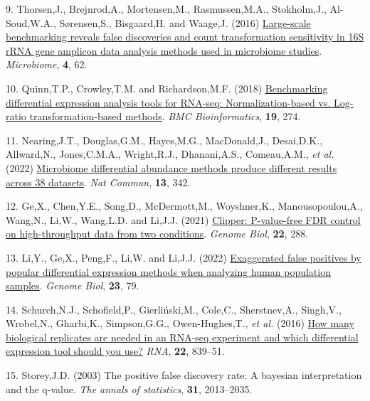 \documentclass[
]{article}
\newlength{\cslhangindent}
\newenvironment{CSLReferences}[2] %
 {\begin{list}{}{%
  \setlength{\itemindent}{0pt}
  \setlength{\leftmargin}{0pt}
  \setlength{\parsep}{0pt}
  \ifodd #1
   \setlength{\leftmargin}{\cslhangindent}
   \setlength{\itemindent}{-1\cslhangindent}
  \fi
  \setlength{\itemsep}{#2\baselineskip}}}
 {\end{list}}
\begin{document}
\begin{CSLReferences}{1}{1}
9. Thorsen,J., Brejnrod,A., Mortensen,M., Rasmussen,M.A., Stokholm,J.,
Al-Soud,W.A., Sørensen,S., Bisgaard,H. and Waage,J. (2016)
\href{https://doi.org/10.1186/s40168-016-0208-8}{Large-scale
benchmarking reveals false discoveries and count transformation
sensitivity in 16{S} r{RNA} gene amplicon data analysis methods used in
microbiome studies}. \emph{Microbiome}, \textbf{4}, 62.

10. Quinn,T.P., Crowley,T.M. and Richardson,M.F. (2018)
\href{https://doi.org/10.1186/s12859-018-2261-8}{Benchmarking
differential expression analysis tools for RNA-seq: Normalization-based
vs. Log-ratio transformation-based methods}. \emph{BMC Bioinformatics},
\textbf{19}, 274.

11. Nearing,J.T., Douglas,G.M., Hayes,M.G., MacDonald,J., Desai,D.K.,
Allward,N., Jones,C.M.A., Wright,R.J., Dhanani,A.S., Comeau,A.M.,
\emph{et al.} (2022)
\href{https://doi.org/10.1038/s41467-022-28034-z}{Microbiome
differential abundance methods produce different results across 38
datasets}. \emph{Nat Commun}, \textbf{13}, 342.

12. Ge,X., Chen,Y.E., Song,D., McDermott,M., Woyshner,K.,
Manousopoulou,A., Wang,N., Li,W., Wang,L.D. and Li,J.J. (2021)
\href{https://doi.org/10.1186/s13059-021-02506-9}{Clipper: P-value-free
FDR control on high-throughput data from two conditions}. \emph{Genome
Biol}, \textbf{22}, 288.

13. Li,Y., Ge,X., Peng,F., Li,W. and Li,J.J. (2022)
\href{https://doi.org/10.1186/s13059-022-02648-4}{Exaggerated false
positives by popular differential expression methods when analyzing
human population samples}. \emph{Genome Biol}, \textbf{23}, 79.

14. Schurch,N.J., Schofield,P., Gierliński,M., Cole,C., Sherstnev,A.,
Singh,V., Wrobel,N., Gharbi,K., Simpson,G.G., Owen-Hughes,T., \emph{et
al.} (2016) \href{https://doi.org/10.1261/rna.053959.115}{How many
biological replicates are needed in an RNA-seq experiment and which
differential expression tool should you use?} \emph{RNA}, \textbf{22},
839--51.

15. Storey,J.D. (2003) The positive false discovery rate: A bayesian
interpretation and the q-value. \emph{The annals of statistics},
\textbf{31}, 2013--2035.


\end{CSLReferences}
\end{document}
